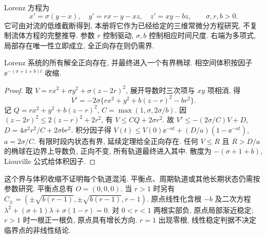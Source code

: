 Lorenz 方程为
\begin{equation}\label{eq:lorenz}
x'=\sigma(y-x),\quad y'=rx-y-xz,\quad z'=xy-bz,
\qquad \sigma,r,b>0.
\end{equation}
它可由对流的低维截断得到, 本册将它作为已经给定的三维常微分方程研究, 不复制流体方程的完整推导. 参数 $r$ 控制驱动, $\sigma,b$ 控制相应时间尺度. 右端为多项式, 局部存在唯一性立即成立, 全正向存在则仍需界.
\begin{proposition}
Lorenz 系统的所有解全正向存在, 并最终进入一个有界椭球. 相空间体积按因子 $\ee^{-(\sigma+1+b)t}$ 收缩.
\end{proposition}
\begin{proof}
取 $V=rx^2+\sigma y^2+\sigma(z-2r)^2$, 展开导数时三次项与 $xy$ 项相消, 得
\[
V'=-2\sigma\{rx^2+y^2+b(z-r)^2-br^2\}.
\]
记 $Q=rx^2+y^2+b(z-r)^2$, $C=\max(1,\sigma,2\sigma/b)$. 因 $(z-2r)^2\le2(z-r)^2+2r^2$, 有 $V\le CQ+2\sigma r^2$. 故
$V'\le-(2\sigma/C)V+D$, $D=4\sigma^2r^2/C+2\sigma br^2$.
积分因子得 $V(t)\le V(0)\ee^{-at}+(D/a)(1-\ee^{-at})$, $a=2\sigma/C$. 有限时段内状态有界, 延续定理给全正向存在. 任何 $V\le R$ 且 $R>D/a$ 的椭球在边界上导数负, 正向不变, 所有轨道最终进入其中. 散度为 $-(\sigma+1+b)$, Liouville 公式给体积因子.
\end{proof}
这个界与体积收缩不证明每个轨道混沌. 平衡点、周期轨道或其他长期状态仍需按参数研究.
平衡点总有 $O=(0,0,0)$. 当 $r>1$ 时另有
$C_\pm=(\pm\sqrt{b(r-1)},\pm\sqrt{b(r-1)},r-1)$.
原点线性化含根 $-b$ 及二次方程 $\lambda^2+(\sigma+1)\lambda+\sigma(1-r)=0$. 对 $0<r<1$ 两根实部负, 原点局部渐近稳定; $r>1$ 时一根正一根负, 原点具有增长方向. $r=1$ 出现零根, 线性稳定判据不决定临界点的非线性结论.


